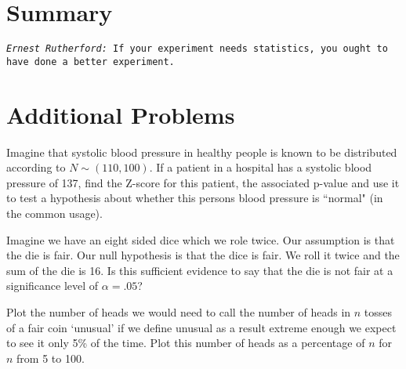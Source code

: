 \section{Summary}



\noindent \texttt{\emph{Ernest Rutherford:} If your experiment needs statistics, you ought to have done a better experiment.}






\section{Additional Problems}



\begin{exe} Imagine that systolic blood pressure in healthy people  is known to be distributed according to $N \sim (110,100)$. If a patient in a hospital has a systolic blood pressure of 137, find the Z-score for this patient, the associated p-value and use it to test a hypothesis about whether this persons blood pressure is ``normal" (in the common usage). \end{exe}



\begin{exe} Imagine we have an eight sided dice which we role twice. Our assumption is that the die is fair.  Our null hypothesis is that the dice is fair.  We roll it twice and the sum of the die is 16. Is this sufficient evidence to say that the die is not fair at a significance level of $\alpha=.05$? \end{exe}






\begin{exe} Plot the number of heads we would need to call the number of heads in $n$ tosses of a fair coin `unusual' if we define unusual as a result extreme enough we expect to see it only 5\% of the time.  Plot this number of heads as a percentage of $n$ for $n$ from 5 to 100. \end{exe}



